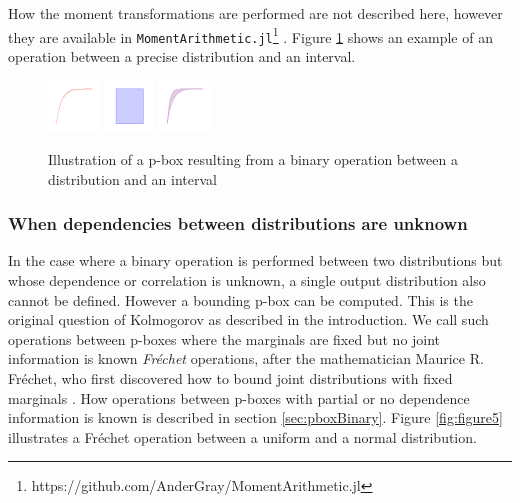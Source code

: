 \documentclass{juliacon}
\begin{document}
How the moment transformations are performed are not described here, however they are available in \texttt{MomentArithmetic.jl}\footnote{https://github.com/AnderGray/MomentArithmetic.jl} \cite{ferson2021distribution}. Figure \ref{fig:figure4} shows an example of an operation between a precise distribution and an interval.


\begin{figure}[htp]

  \centering
  \includegraphics[width=0.12\textwidth]{../examples/JuliaCon/fig4/fig4_dist.pdf}
  \raisebox{8.0mm}{\noindent\Large*}
  \includegraphics[width=0.12\textwidth]{../examples/JuliaCon/fig4/fig4_in.pdf}
  \raisebox{9.0mm}{{\Large$\rightarrow$}}
  \includegraphics[width=0.12\textwidth]{../examples/JuliaCon/fig4/fig4_pbox.pdf}
  

  \caption{Illustration of a p-box resulting from a binary operation between a distribution and an interval}
  \label{fig:figure4}
  
\end{figure}


\subsubsection{When dependencies between distributions are unknown} \hfill \break

In the case where a binary operation is performed between two distributions but whose dependence or correlation is unknown, a single output distribution also cannot be defined. However a bounding p-box can be computed. This is the original question of Kolmogorov as described in the introduction. We call such operations between p-boxes where the marginals are fixed but no joint information is known \textit{Fréchet} operations, after the mathematician Maurice R. Fréchet, who first discovered how to bound joint distributions with fixed marginals \cite{frechet1935generalisation}. How operations between p-boxes with partial or no dependence information is known is described in section \ref{sec:pboxBinary}. Figure \ref{fig:figure5} illustrates a Fréchet operation between a uniform and a normal distribution.
\end{document}
